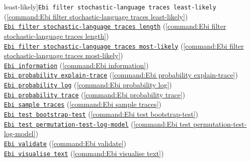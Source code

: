 {least-likely]{\texttt{Ebi filter stochastic-language traces least-likely}} (\cref{command:Ebi filter stochastic-language traces least-likely})\\\null\qquad\hyperref[command:Ebi filter stochastic-language traces length]{\texttt{Ebi filter stochastic-language traces length}} (\cref{command:Ebi filter stochastic-language traces length})\\\null\qquad\hyperref[command:Ebi filter stochastic-language traces most-likely]{\texttt{Ebi filter stochastic-language traces most-likely}} (\cref{command:Ebi filter stochastic-language traces most-likely})\\\null\qquad\hyperref[command:Ebi information]{\texttt{Ebi information}} (\cref{command:Ebi information})\\\null\qquad\hyperref[command:Ebi probability explain-trace]{\texttt{Ebi probability explain-trace}} (\cref{command:Ebi probability explain-trace})\\\null\qquad\hyperref[command:Ebi probability log]{\texttt{Ebi probability log}} (\cref{command:Ebi probability log})\\\null\qquad\hyperref[command:Ebi probability trace]{\texttt{Ebi probability trace}} (\cref{command:Ebi probability trace})\\\null\qquad\hyperref[command:Ebi sample traces]{\texttt{Ebi sample traces}} (\cref{command:Ebi sample traces})\\\null\qquad\hyperref[command:Ebi test bootstrap-test]{\texttt{Ebi test bootstrap-test}} (\cref{command:Ebi test bootstrap-test})\\\null\qquad\hyperref[command:Ebi test permutation-test-log-model]{\texttt{Ebi test permutation-test-log-model}} (\cref{command:Ebi test permutation-test-log-model})\\\null\qquad\hyperref[command:Ebi validate]{\texttt{Ebi validate}} (\cref{command:Ebi validate})\\\null\qquad\hyperref[command:Ebi visualise text]{\texttt{Ebi visualise text}} (\cref{command:Ebi visualise text})
}
